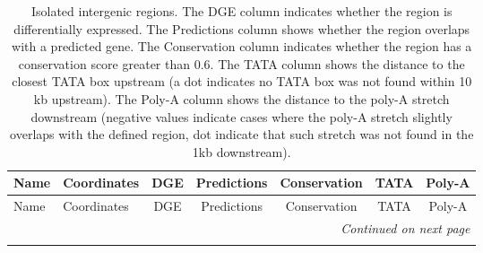 \renewcommand{\arraystretch}{1.5}

\begin{longtable}{llccccc}
\caption{Isolated intergenic regions. The DGE column indicates whether the region is differentially expressed. The Predictions column shows whether the region overlaps with a predicted gene. The Conservation column indicates whether the region has a conservation score greater than 0.6. The TATA column shows the distance to the closest TATA box upstream (a dot indicates no TATA box was not found within 10 kb upstream). The Poly-A column shows the distance to the poly-A stretch downstream (negative values indicate cases where the poly-A stretch slightly overlaps with the defined region, dot indicate that such stretch was not found in the 1kb downstream).} 
\label{tab:isolated}\\
\toprule
Name & Coordinates & DGE & Predictions & Conservation & TATA & Poly-A \\
\midrule
\endfirsthead

\toprule
Name & Coordinates & DGE & Predictions & Conservation & TATA & Poly-A \\
\midrule
\endhead

\midrule
\multicolumn{7}{r}{\textit{Continued on next page}} \\
\bottomrule
\endfoot

\bottomrule
\endlastfoot


\end{longtable}
